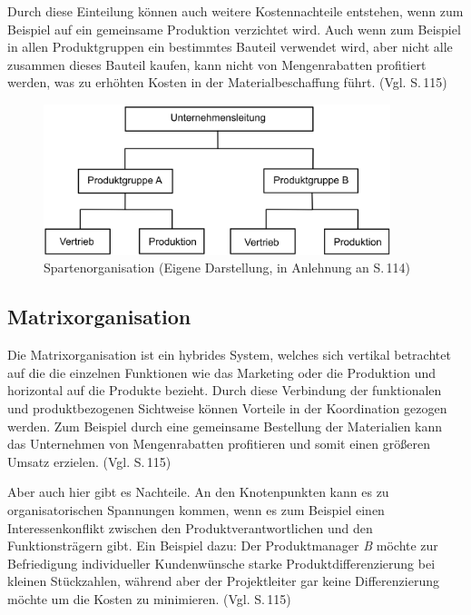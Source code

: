         Durch diese Einteilung können auch weitere Kostennachteile entstehen, wenn zum Beispiel auf ein gemeinsame 
        Produktion verzichtet wird. Auch wenn zum Beispiel in allen Produktgruppen ein bestimmtes Bauteil verwendet 
        wird, aber nicht alle zusammen dieses Bauteil kaufen, kann nicht von Mengenrabatten profitiert werden, was zu 
        erhöhten Kosten in der Materialbeschaffung führt. (Vgl. \cite{Woehe2020} S.\,115)

        \begin{figure}[ht]
            \centering
            \includegraphics[width = 0.9\textwidth]{Eigene Darstellungen/Spartenorganisation.PNG}
            \caption{Spartenorganisation (Eigene Darstellung, in Anlehnung an \cite{Woehe2020} S.\,114)} \label{Sparte}
        \end{figure}
        

    \subsection{Matrixorganisation} \label{Matrixorganisation}
        Die Matrixorganisation ist ein hybrides System, welches sich vertikal betrachtet auf die die einzelnen 
        Funktionen wie das Marketing oder die Produktion und horizontal auf die Produkte bezieht. Durch diese Verbindung 
        der funktionalen und produktbezogenen Sichtweise können Vorteile in der Koordination gezogen werden. Zum 
        Beispiel durch eine gemeinsame Bestellung der Materialien kann das Unternehmen von Mengenrabatten profitieren 
        und somit einen größeren Umsatz erzielen. (Vgl. \cite{Woehe2020} S.\,115)

        Aber auch hier gibt es Nachteile. An den Knotenpunkten kann es zu organisatorischen Spannungen kommen, wenn es 
        zum Beispiel einen Interessenkonflikt zwischen den Produktverantwortlichen und den Funktionsträgern gibt.
        Ein Beispiel dazu: Der Produktmanager \emph{B} möchte zur Befriedigung individueller Kundenwünsche starke 
        Produktdifferenzierung bei kleinen Stückzahlen, während aber der Projektleiter gar keine Differenzierung möchte
        um die Kosten zu minimieren. (Vgl. \cite{Woehe2020} S.\,115)

